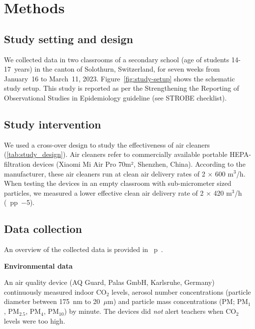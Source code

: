 \documentclass[fleqn,11pt]{wlscirep}
\begin{document}
\section*{Methods}

\subsection*{Study setting and design} 

\noindent We collected data in two classrooms of a secondary school (age of students 14-17~years) in the canton of Solothurn, Switzerland, for seven weeks from January~16 to March~11, 2023. Figure~\ref{fig:study-setup} shows the schematic study setup. This study is reported as per the Strengthening the Reporting of Observational Studies in Epidemiology guideline (see STROBE checklist).

\subsection*{Study intervention} 

\noindent We used a cross-over design to study the effectiveness of air cleaners (\cref{tab:study_design}). Air cleaners refer to commercially available portable HEPA-filtration devices (Xiaomi Mi Air Pro 70m², Shenzhen, China). According to the manufacturer, these air cleaners run at clean air delivery rates of 2$\,\times\,$600 m$^{3}$/h. When testing the devices in an empty classroom with sub-micrometer sized particles, we measured a lower effective clean air delivery rate of 2$\,\times\,$420 m$^{3}$/h (\supp~pp~$-$5). 
 
\subsection*{Data collection}

An overview of the collected data is provided in \supp~p~. \medskip

\noindent\textbf{Environmental data} \smallskip

\noindent An air quality device (AQ Guard, Palas GmbH, Karlsruhe, Germany) continuously measured indoor CO$_2$ levels, aerosol number concentrations (particle diameter between 175~nm to 20~$\mu$m) and particle mass concentrations (PM; PM$_1$, PM$_{2.5}$, PM$_4$, PM$_{10}$) by minute.\cite{Banholzer2023PLoSMed} The devices did \emph{not} alert teachers when CO$_2$ levels were too high.\medskip
\end{document}
